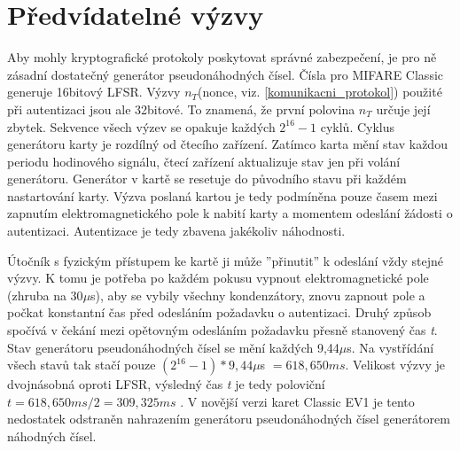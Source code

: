 \section{Předvídatelné výzvy}
\label{predvidatelne_nonce}
Aby mohly kryptografické protokoly poskytovat správné zabezpečení, je pro ně zásadní dostatečný generátor pseudonáhodných čísel. Čísla pro MIFARE Classic generuje 16bitový LFSR. Výzvy $n_T$(nonce, viz. \ref{komunikacni_protokol}) použité při autentizaci jsou ale 32bitové. To znamená, že první polovina $n_T$ určuje její zbytek. Sekvence všech výzev se opakuje každých $2^{16} - 1$ cyklů\cite{Cryptanalisis}. Cyklus generátoru karty je rozdílný od čtecího zařízení. Zatímco karta mění stav každou periodu hodinového signálu, čtecí zařízení aktualizuje stav jen při volání generátoru\cite{Dismantling_Mifare_Classic}. Generátor v kartě se resetuje do původního stavu při každém nastartování karty. Výzva poslaná kartou je tedy podmíněna pouze časem mezi zapnutím elektromagnetického pole k nabití karty a momentem odeslání žádosti o autentizaci. Autentizace je tedy zbavena jakékoliv náhodnosti. \par
Útočník s fyzickým přístupem ke kartě ji může ''přinutit'' k odeslání vždy stejné výzvy. K tomu je potřeba po každém pokusu vypnout elektromagnetické pole (zhruba na 30$\mu$s), aby se vybily všechny kondenzátory, znovu zapnout pole a počkat konstantní čas před odesláním požadavku o autentizaci. Druhý způsob spočívá v čekání mezi opětovným odesláním požadavku přesně stanovený čas \emph{t}. Stav generátoru pseudonáhodných čísel se mění každých 9,44$\mu$s. Na vystřídání všech stavů tak stačí pouze $(2^{16} - 1) * 9,44\mu$s $= 618,650ms$. Velikost výzvy je dvojnásobná oproti LFSR, výsledný čas \emph{t} je tedy poloviční $t = 618,650ms/2 = 309,325ms$ \cite{Wirelessly_Pickpocketing}. V novější verzi karet Classic EV1 je tento nedostatek odstraněn nahrazením generátoru pseudonáhodných čísel generátorem náhodných čísel\cite{MIFARE_Classic_Official_about}.

